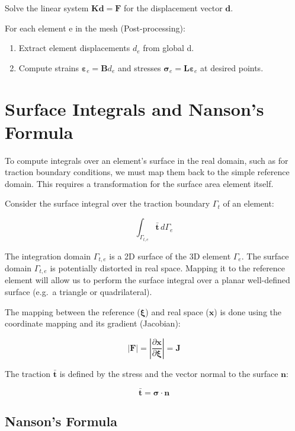 \documentclass[
  11pt,
  a4paper,
]{scrbook}
\begin{document}
\begin{tcolorbox}
Solve the linear system \(\mathbf{K}\mathbf{d} = \mathbf{F}\) for the
displacement vector \(\mathbf{d}\).

For each element e in the mesh (Post-processing):

\begin{enumerate}
\def\labelenumi{\alph{enumi}.}
\item
  Extract element displacements \(d_e\) from global d.
\item
  Compute strains \(\boldsymbol{\varepsilon}_e = \mathbf{B} d_e\) and
  stresses
  \(\boldsymbol{\sigma}_e = \mathbf{L} \boldsymbol{\varepsilon}_e\) at
  desired points.
\end{enumerate}

\end{tcolorbox}

\section{Surface Integrals and Nanson's
Formula}\label{surface-integrals-and-nansons-formula}

To compute integrals over an element's surface in the real domain, such
as for traction boundary conditions, we must map them back to the simple
reference domain. This requires a transformation for the surface area
element itself.

Consider the surface integral over the traction boundary \(\Gamma_t\) of
an element:

\[\int_{\Gamma_{t,e}} \bar{\mathbf{t}} \, d\Gamma_e\]

The integration domain \(\Gamma_{t,e}\) is a 2D surface of the 3D
element \(\Gamma_e\). The surface domain \(\Gamma_{t,e}\) is potentially
distorted in real space. Mapping it to the reference element will allow
us to perform the surface integral over a planar well-defined surface
(e.g.~a triangle or quadrilateral).

The mapping between the reference (\(\boldsymbol{\xi}\)) and real space
(\(\boldsymbol{x}\)) is done using the coordinate mapping and its
gradient (Jacobian):

\[|\boldsymbol{F}| = |\frac{\partial \boldsymbol{x}}{\partial \boldsymbol{\xi}}| = \boldsymbol{J}\]

The traction \(\bar{\mathbf{t}}\) is defined by the stress and the
vector normal to the surface \(\mathbf{n}\):

\[\bar{\mathbf{t}} = \boldsymbol{\sigma} \cdot \mathbf{n}\]

\subsection{Nanson's Formula}\label{nansons-formula}
\end{document}
